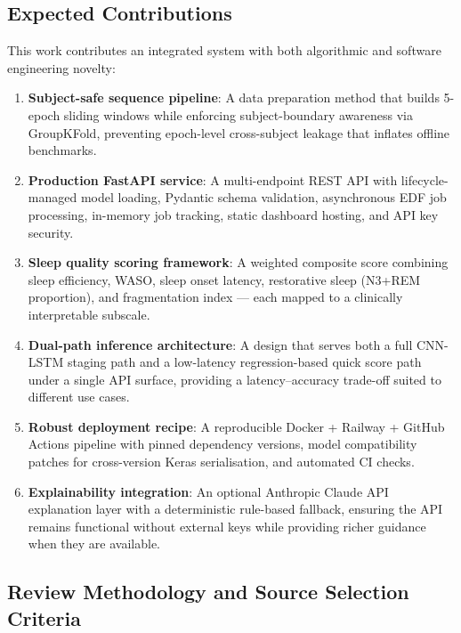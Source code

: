 \documentclass[10pt]{article}
\begin{document}
\subsection{Expected Contributions}
\label{sec:contributions}

This work contributes an integrated system with both algorithmic and software engineering novelty:

\begin{enumerate}
  \item \textbf{Subject-safe sequence pipeline}: A data preparation method that builds 5-epoch sliding windows while enforcing subject-boundary awareness via GroupKFold, preventing epoch-level cross-subject leakage that inflates offline benchmarks.
  \item \textbf{Production FastAPI service}: A multi-endpoint REST API with lifecycle-managed model loading, Pydantic schema validation, asynchronous EDF job processing, in-memory job tracking, static dashboard hosting, and API key security.
  \item \textbf{Sleep quality scoring framework}: A weighted composite score combining sleep efficiency, WASO, sleep onset latency, restorative sleep (N3+REM proportion), and fragmentation index --- each mapped to a clinically interpretable subscale.
  \item \textbf{Dual-path inference architecture}: A design that serves both a full CNN-LSTM staging path and a low-latency regression-based quick score path under a single API surface, providing a latency--accuracy trade-off suited to different use cases.
  \item \textbf{Robust deployment recipe}: A reproducible Docker + Railway + GitHub Actions pipeline with pinned dependency versions, model compatibility patches for cross-version Keras serialisation, and automated CI checks.
  \item \textbf{Explainability integration}: An optional Anthropic Claude API explanation layer with a deterministic rule-based fallback, ensuring the API remains functional without external keys while providing richer guidance when they are available.
\end{enumerate}

\subsection{Review Methodology and Source Selection Criteria}
\label{sec:methodology}
\end{document}
